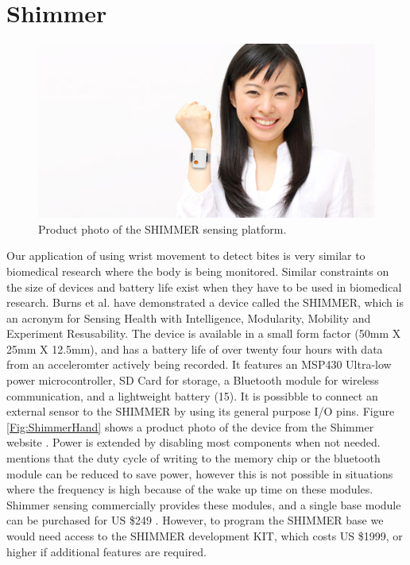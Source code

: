 \section{Shimmer}
\label{Sec:Shimmer}
\begin{figure}
\begin{center}
\includegraphics{images/shimmerphoto.jpg}
\caption{Product photo of the SHIMMER sensing platform.}
\label{fig:AccAxis}
\end{center}
\end{figure}
Our application of using wrist movement to detect bites is very similar to biomedical research where the body is being monitored.
Similar constraints on the size of devices and battery life exist when they have to be used in biomedical research.
Burns et al. \cite{burns2010shimmer} have demonstrated a device called the SHIMMER,
which is an acronym for Sensing Health with Intelligence, Modularity, Mobility and Experiment Resusability.
The device is available in a small form factor (50mm X 25mm X 12.5mm),
and has a battery life of over twenty four hours with data from an acceleromter actively being recorded.
It features an MSP430 Ultra-low power microcontroller,
SD Card for storage,
a Bluetooth module for wireless communication,
and a lightweight battery (15).
It is possibble to connect an external sensor to the SHIMMER by using its general purpose I/O pins.
Figure \ref{Fig:ShimmerHand} shows a product photo of the device from the Shimmer website \cite{Web:ShimmerBuyKit}.
Power is extended by disabling most components when not needed.
\cite{burns2010shimmer} mentions that the duty cycle of writing to the memory chip or the bluetooth module can be reduced to save power,
however this is not possible in situations where the frequency is high because of the wake up time on these modules.
Shimmer sensing commercially provides these modules,
and a single base module can be purchased for US \$249 \cite{Web:ShimmerBuy}.
However, to program the SHIMMER base we would need access to the SHIMMER development KIT,
which costs US \$1999, or higher if additional features are required.

